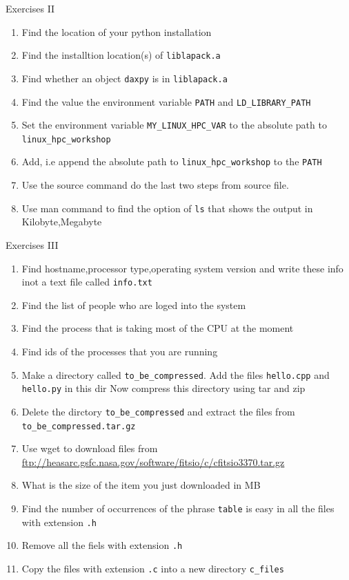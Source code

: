\documentclass{beamer}
\begin{document}
\begin{frame}{Exercises II}
  \fontsize{8pt}{8}\selectfont
  \begin{enumerate}
    \item Find the location of your python installation
    \item Find the installtion location(s) of \texttt{liblapack.a}
    \item Find whether an object \texttt{daxpy} is in \texttt{liblapack.a}
    \item Find the value the environment variable \texttt{PATH} and \texttt{LD\_LIBRARY\_PATH}
    \item Set the environment variable \texttt{MY\_LINUX\_HPC\_VAR} to the absolute path to \texttt{linux\_hpc\_workshop}
    \item Add, i.e append the absolute path to \texttt{linux\_hpc\_workshop} to the \texttt{PATH}
    \item Use the source command do the last two steps from source file.
    \item Use man command to find the option of \texttt{ls} that shows the output in Kilobyte,Megabyte
  \end{enumerate}
\end{frame}

\begin{frame}{Exercises III}
  \fontsize{8pt}{8}\selectfont
  \begin{enumerate}
    \item Find hostname,processor type,operating system version and write these info inot a text file called \texttt{info.txt}
    \item Find the list of people who are loged into the system
    \item Find the process that is taking most of the CPU at the moment
    \item Find ids of the processes that you are running
    \item Make a directory called \texttt{to\_be\_compressed}. Add the files \texttt{hello.cpp} and \texttt{hello.py} in this dir
    Now compress this directory using tar and zip
    \item Delete the dirctory \texttt{to\_be\_compressed} and extract the files from \texttt{to\_be\_compressed.tar.gz}
    \item Use wget to download  files from \url{ftp://heasarc.gsfc.nasa.gov/software/fitsio/c/cfitsio3370.tar.gz}
    \item What is the size of the item you just downloaded in MB
    \item Find the number of occurrences of the phrase \texttt{table} is easy in all the files with extension \texttt{.h}
    \item Remove all the fiels with extension \texttt{.h}
    \item Copy the files with extension \texttt{.c} into a new directory \texttt{c\_files}
  \end{enumerate}
\end{frame}
\end{document}
